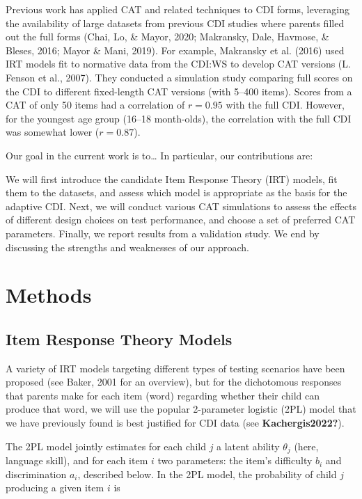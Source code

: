 \documentclass[10pt, letterpaper]{article}
\begin{document}
Previous work has applied CAT and related techniques to CDI forms,
leveraging the availability of large datasets from previous CDI studies
where parents filled out the full forms (Chai, Lo, \& Mayor, 2020;
Makransky, Dale, Havmose, \& Bleses, 2016; Mayor \& Mani, 2019). For
example, Makransky et al. (2016) used IRT models fit to normative data
from the CDI:WS to develop CAT versions (L. Fenson et al., 2007). They
conducted a simulation study comparing full scores on the CDI to
different fixed-length CAT versions (with 5--400 items). Scores from a
CAT of only 50 items had a correlation of \(r=0.95\) with the full CDI.
However, for the youngest age group (16--18 month-olds), the correlation
with the full CDI was somewhat lower (\(r=0.87\)).

Our goal in the current work is to\ldots{} In particular, our
contributions are:

We will first introduce the candidate Item Response Theory (IRT) models,
fit them to the datasets, and assess which model is appropriate as the
basis for the adaptive CDI. Next, we will conduct various CAT
simulations to assess the effects of different design choices on test
performance, and choose a set of preferred CAT parameters. Finally, we
report results from a validation study. We end by discussing the
strengths and weaknesses of our approach.

\hypertarget{methods}{%
\section{Methods}\label{methods}}

\hypertarget{item-response-theory-models}{%
\subsection{Item Response Theory
Models}\label{item-response-theory-models}}

A variety of IRT models targeting different types of testing scenarios
have been proposed (see Baker, 2001 for an overview), but for the
dichotomous responses that parents make for each item (word) regarding
whether their child can produce that word, we will use the popular
2-parameter logistic (2PL) model that we have previously found is best
justified for CDI data (see \textbf{Kachergis2022?}).

The 2PL model jointly estimates for each child \(j\) a latent ability
\(\theta_j\) (here, language skill), and for each item \(i\) two
parameters: the item's difficulty \(b_i\) and discrimination \(a_i\),
described below. In the 2PL model, the probability of child \(j\)
producing a given item \(i\) is
\end{document}
